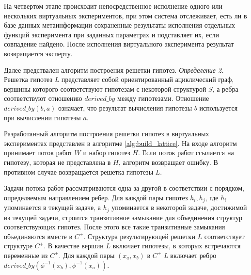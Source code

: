 На четвертом этапе происходит непосредственное исполнение одного или нескольких виртуальных экспериментов, при этом 
система отслеживает, есть ли в базе данных метаинформации сохраненные результаты исполнения отдельных функций 
эксперимента при заданных параметрах и подставляет их, если совпадение найдено. После исполнения виртуального 
эксперимента результат возвращается эксперту.

Далее предствален алгоритм построения решетки гипотез. 
\textit{Определение 2.} Решетка гипотез $L$ представляет собой ориентированный ациклический граф, вершины которого 
соответствуют гипотезам с некоторой структурой $S$, а ребра соответствуют отношению $derived\_by$  между гипотезами. 
Отношение $derived\_ by\left(b, a\right)$ означает, что результат вычисления гипотезы $b$ используется при вычислении 
гипотезы $a$.

Разработанный алгоритм построения решетки гипотез в виртуальных экспериментах представлен в алгоритме
\ref{alg:build_lattice}. На входе алгоритм принимает поток работ $W$ и набор гипотез $H$. 
Если поток работ ссылается на гипотезу, которая не представлена в $H$, алгоритм возвращает ошибку. 
В противном случае возвращается решетка гипотезы $L$.  

Задачи потока работ рассматриваются одна за другой в соответствии с порядком, определяемым направлением ребер. 
Для каждой пары гипотез $h_i, h_j$, где $h_i$ упоминается в текущей задаче, а $h_j$ упоминается в некоторой задаче, 
достижимой из текущей задачи, строится транзитивное замыкание для объединения структур соответствующих гипотез. 
После этого все такие транзитивные замыкания объединяются вместе в $C^+$. Структура результирующей решетки $L$ 
соответствует структуре $C^+$. В качестве вершин $L$ включает гипотезы, в которых встречаются переменные из $C^+$. 
Для каждой пары $\left(x_a, x_b\right)$ в $C^+$ \textit{L} включает ребро 
$derived\_by \left(\phi^{-1}\left(x_b\right), \phi^{-1}\left(x_a\right)\right)$.

